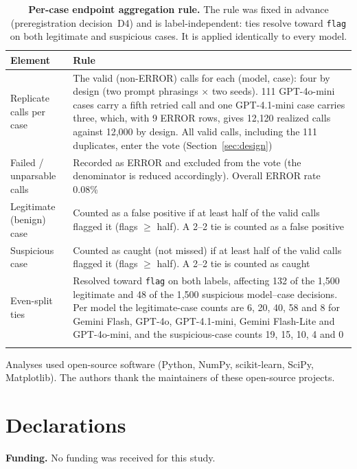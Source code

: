 \documentclass[pdflatex,sn-basic,Numbered]{sn-jnl}
\begin{document}
\begin{table}[t]
\caption{\textbf{Per-case endpoint aggregation rule.} The rule was fixed in advance (preregistration decision~D4) and is label-independent: ties resolve toward \texttt{flag} on both legitimate and suspicious cases. It is applied identically to every model.}\label{tab:vote}
\begin{tabular}{@{}p{}p{}@{}}
\toprule
Element & Rule \\
\midrule
Replicate calls per case & The valid (non-ERROR) calls for each (model, case): four by design (two prompt phrasings $\times$ two seeds). 111 GPT-4o-mini cases carry a fifth retried call and one GPT-4.1-mini case carries three, which, with 9 ERROR rows, gives 12{,}120 realized calls against 12{,}000 by design. All valid calls, including the 111 duplicates, enter the vote (Section~\ref{sec:design}) \\
Failed / unparsable calls & Recorded as ERROR and excluded from the vote (the denominator is reduced accordingly). Overall ERROR rate 0.08\% \\
Legitimate (benign) case & Counted as a false positive if at least half of the valid calls flagged it (flags $\geq$ half). A 2--2 tie is counted as a false positive \\
Suspicious case & Counted as caught (not missed) if at least half of the valid calls flagged it (flags $\geq$ half). A 2--2 tie is counted as caught \\
Even-split ties & Resolved toward \texttt{flag} on both labels, affecting 132 of the 1{,}500 legitimate and 48 of the 1{,}500 suspicious model--case decisions. Per model the legitimate-case counts are 6, 20, 40, 58 and 8 for Gemini Flash, GPT-4o, GPT-4.1-mini, Gemini Flash-Lite and GPT-4o-mini, and the suspicious-case counts 19, 15, 10, 4 and 0 \\
\botrule
\end{tabular}
\end{table}

\clearpage
\backmatter

Analyses used open-source software (Python, NumPy, scikit-learn, SciPy, Matplotlib). The authors thank the maintainers of these open-source projects.

\section*{Declarations}

\textbf{Funding.} No funding was received for this study.
\end{document}
